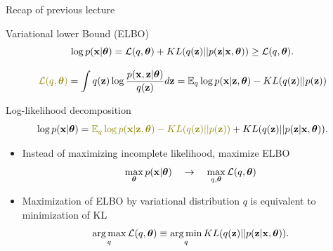 

\usepackage{tikz}

\usetikzlibrary{arrows,shapes,positioning,shadows,trees}

\begin{frame}
\titlepage
\end{frame}
\begin{frame}{Recap of previous lecture}
	\begin{block}{Variational lower Bound (ELBO)}
		\vspace{-0.3cm}
		\[
			\log p(\mathbf{x}| \boldsymbol{\theta}) = \mathcal{L} (q, \boldsymbol{\theta}) + KL(q(\mathbf{z}) || p(\mathbf{z}|\mathbf{x}, \boldsymbol{\theta})) \geq \mathcal{L} (q, \boldsymbol{\theta}).
		\]
	\end{block}
	
	\vspace{-0.5cm}
	\[
	 	{\color{olive}\mathcal{L} (q, \btheta)} = \int q(\bz) \log \frac{p(\bx, \bz | \btheta)}{q(\bz)}d\bz = \mathbb{E}_{q} \log p(\bx | \bz, \btheta) - KL (q(\bz) || p(\bz))
	\]
	\vspace{-0.3cm}
	\begin{block}{Log-likelihood decomposition}
		\vspace{-0.5cm}
		\[
		 \log p(\bx| \btheta) = {\color{olive}\mathbb{E}_{q} \log p(\bx | \bz, \btheta) - KL (q(\bz) || p(\bz))} + KL(q(\bz) || p(\bz|\bx, \btheta)).
		\]
	\end{block}
	\begin{itemize}
	\item Instead of maximizing incomplete likelihood, maximize ELBO
   	\[
  \max_{\boldsymbol{\theta}} p(\mathbf{x} | \boldsymbol{\theta}) \quad \rightarrow \quad \max_{q, \boldsymbol{\theta}} \mathcal{L} (q, \boldsymbol{\theta})
   	\]
   	\item Maximization of ELBO by variational distribution $q$ is equivalent to minimization of KL
  	\[
  \operatorname*{arg\,max}_q \mathcal{L} (q, \boldsymbol{\theta}) \equiv \operatorname*{arg\,min}_q KL(q(\mathbf{z}) || p(\mathbf{z}|\mathbf{x}, \boldsymbol{\theta})).
  	\]
  	\end{itemize}
		   	    
\end{frame}
